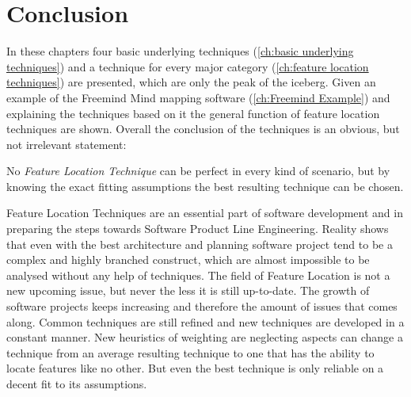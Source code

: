 \chapter{Conclusion}

In these chapters four basic underlying techniques (\autoref{ch:basic underlying techniques}) and a technique for every major category (\autoref{ch:feature location techniques}) are presented, which are only the peak of the iceberg. Given an example of the Freemind Mind mapping software (\autoref{ch:Freemind Example}) and explaining the techniques based on it the general function of feature location techniques are shown. Overall the conclusion of the techniques is an obvious, but not irrelevant statement: \newline
\begin{center}
	No \textit{Feature Location Technique} can be perfect in every kind of scenario, but by knowing the exact fitting assumptions the best resulting technique can be chosen.
\end{center} 

Feature Location Techniques are an essential part of software development and in preparing the steps towards Software Product Line Engineering. Reality shows that even with the best architecture and planning software project tend to be a complex and highly branched construct, which are almost impossible to be analysed without any help of techniques. \newline
The field of Feature Location is not a new upcoming issue, but never the less it is still up-to-date. The growth of software projects keeps increasing and therefore the amount of issues that comes along. Common techniques are still refined and new techniques are developed in a constant manner. New heuristics of weighting are neglecting aspects can change a technique from an average resulting technique to one that has the ability to locate features like no other. But even the best technique is only reliable on a decent fit to its assumptions. \newline



\cleardoublepage
